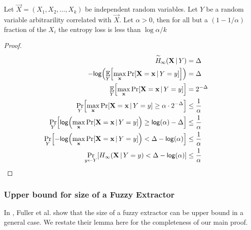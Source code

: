 
\begin{lemma}
    \label{lem:markovpred}
    Let $\vec{X} = (X_1, X_2, \ldots, X_k)$ be independent random variables. Let $Y$ be a random variable arbitrarility correlated with $\vec{X}$. 
    Let $\alpha > 0$, then for all but a $(1-1/\alpha)$ fraction of the $X_i$ the entropy loss is less than $\log{\alpha}/k$
\end{lemma}

\begin{proof} 

\begin{align*}
    \acminent{\vec{X}}{Y} &= \Delta\\
    -\log{\Exlim{Y}{\max\limits_{\vec{x}} \Prob{\Vec{X} = \vec{x} \,|\, Y = y}}} &= \Delta\\
    \Exlim{Y}{\max\limits_{\vec{x}} \Prob{\Vec{X} = \vec{x} \,|\, Y = y}} &= 2^{-\Delta}\\
    \Problim{Y}{\max\limits_{\vec{x}} \Prob{\Vec{X} = \vec{x} \,|\, Y = y} \geq \alpha \cdot 2^{-\Delta}} &\leq \frac{1}{\alpha} \\
    \Problim{Y}{\log{\max\limits_{\vec{x}} \Prob{\Vec{X} = \vec{x} \,|\, Y = y}} \geq \log{\alpha} -\Delta} &\leq \frac{1}{\alpha} \\
    \Problim{Y}{-\log{\max\limits_{\vec{x}} \Prob{\Vec{X} = \vec{x} \,|\, Y = y}} < \Delta -\log{\alpha}} &\leq \frac{1}{\alpha} \\
    \Problim{y\leftarrow Y}{\minent{\vec{X}\, |\, Y=y} < \Delta -\log{\alpha}} &\leq \frac{1}{\alpha}
\end{align*}
    
\end{proof}

\subsubsection{Upper bound for size of a Fuzzy Extractor}
In \cite{fuller2020fuzzy}, Fuller et al. show that the size of a fuzzy extractor can be upper bound in a general case. 
We restate their lemma here for the completeness of our main proof. 

